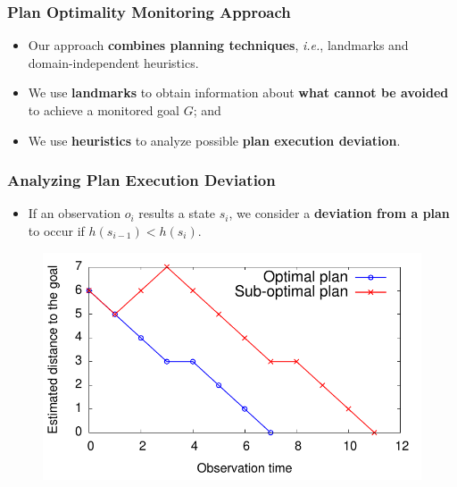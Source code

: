 \documentclass{beamer}
\begin{document}
\begin{frame}[c]\frametitle{Plan Optimality Monitoring Approach}
   	\begin{itemize}
   		\item Our approach \textbf{combines planning techniques}, \textit{i.e.}, landmarks and domain-independent heuristics.
		\item We use \textbf{landmarks} to obtain information about \textbf{what cannot be avoided} to achieve a monitored goal $G$; and
		\item We use \textbf{heuristics} to analyze possible \textbf{plan execution deviation}.
	\end{itemize}
\end{frame}
\begin{frame}[c]\frametitle{Analyzing Plan Execution Deviation}
   	\begin{itemize}
		\item If an observation $o_i$ results a state $s_i$, we consider a \textbf{deviation from a plan} to occur if $h(s_{i-1}) < h(s_i)$.
   	\end{itemize}
  	\begin{figure}[here]
		\includegraphics[width=0.85\linewidth]{fig/plan_execution-deviation.pdf}
	\end{figure} 
\end{frame}
\end{document}
